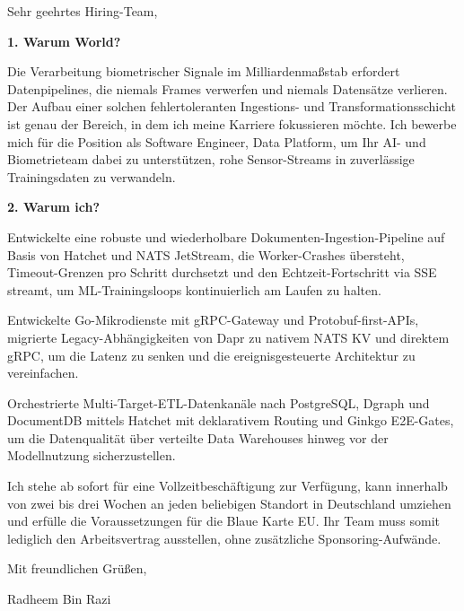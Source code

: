 \documentclass[11pt,a4paper]{coverletter}
\begin{document}
\opening{Sehr geehrtes Hiring-Team,}

\vspace{8pt}\noindent\textbf{1. Warum World?}\par\vspace{3pt}

Die Verarbeitung biometrischer Signale im Milliardenmaßstab erfordert Datenpipelines, die niemals Frames verwerfen und niemals Datensätze verlieren. Der Aufbau einer solchen fehlertoleranten Ingestions- und Transformationsschicht ist genau der Bereich, in dem ich meine Karriere fokussieren möchte. Ich bewerbe mich für die Position als Software Engineer, Data Platform, um Ihr AI- und Biometrieteam dabei zu unterstützen, rohe Sensor-Streams in zuverlässige Trainingsdaten zu verwandeln.

\vspace{8pt}\noindent\textbf{2. Warum ich?}\par\vspace{3pt}

\bullets

  \item Entwickelte eine robuste und wiederholbare Dokumenten-Ingestion-Pipeline auf Basis von Hatchet und NATS JetStream, die Worker-Crashes übersteht, Timeout-Grenzen pro Schritt durchsetzt und den Echtzeit-Fortschritt via SSE streamt, um ML-Trainingsloops kontinuierlich am Laufen zu halten.

  \item Entwickelte Go-Mikrodienste mit gRPC-Gateway und Protobuf-first-APIs, migrierte Legacy-Abhängigkeiten von Dapr zu nativem NATS KV und direktem gRPC, um die Latenz zu senken und die ereignisgesteuerte Architektur zu vereinfachen.

  \item Orchestrierte Multi-Target-ETL-Datenkanäle nach PostgreSQL, Dgraph und DocumentDB mittels Hatchet mit deklarativem Routing und Ginkgo E2E-Gates, um die Datenqualität über verteilte Data Warehouses hinweg vor der Modellnutzung sicherzustellen.

\bulletsend

Ich stehe ab sofort für eine Vollzeitbeschäftigung zur Verfügung, kann innerhalb von zwei bis drei Wochen an jeden beliebigen Standort in Deutschland umziehen und erfülle die Voraussetzungen für die Blaue Karte EU. Ihr Team muss somit lediglich den Arbeitsvertrag ausstellen, ohne zusätzliche Sponsoring-Aufwände.

\closing{Mit freundlichen Grüßen,}{Radheem Bin Razi}
\end{document}
